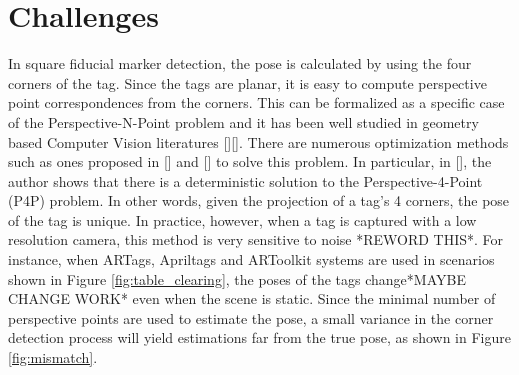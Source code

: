 \section{Challenges}
\label{sec:problem}
In square fiducial marker detection, the pose is calculated by using the four corners of the tag. Since the tags are planar, it is easy to compute perspective point correspondences from the corners. This can be formalized as a specific case of the Perspective-N-Point problem and it has been well studied in geometry based Computer Vision literatures [][]. There are numerous optimization methods such as ones proposed in [] and [] to solve this problem. In particular, in [], the author shows that there is a deterministic solution to the Perspective-4-Point (P4P) problem. In other words, given the projection of a tag's 4 corners, the pose of the tag is unique. In practice, however, when a tag is captured with a low resolution camera, this method is very sensitive to noise *REWORD THIS*. For instance, when ARTags, Apriltags and ARToolkit systems are used in scenarios shown in Figure \ref{fig:table_clearing}, the poses of the tags change*MAYBE CHANGE WORK* even when the scene is static. Since the minimal number of perspective points are used to estimate the pose, a small variance in the corner detection process will yield estimations far from the true pose, as shown in Figure \ref{fig:mismatch}.


